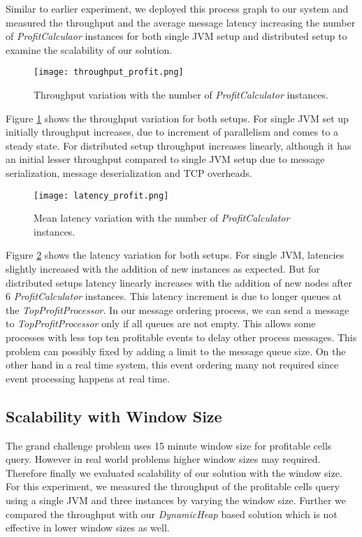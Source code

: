 Similar to earlier experiment,  we deployed this process graph to our system and measured the throughput and the average message latency increasing the number of  \textit{ProfitCalculaor} instances for both single JVM setup and distributed setup to examine the scalability of our solution.

\begin{figure}[!t]
        \centering
        \texttt{[image: throughput\_profit.png]}
        \caption{Throughput variation with the number of \textit{ProfitCalculator} instances.}
        \label{throughput_profit}
\end{figure}
 
Figure \ref{throughput_profit} shows the throughput variation for both setups. For single JVM set up initially throughput increases, due to increment of parallelism and comes to a steady state. For distributed setup  throughput increases linearly, although it has an initial lesser throughput compared to single JVM setup due to message serialization, message deserialization and TCP overheads. 

\begin{figure}[!t]
        \centering
        \texttt{[image: latency\_profit.png]}
        \caption{Mean latency variation with the number of \textit{ProfitCalculator} instances.}
        \label{latency_profit}
\end{figure}

Figure \ref{latency_profit} shows the latency variation for both setups. For single JVM, latencies slightly increased with the addition of new instances as expected. But for distributed setups latency linearly increases with the addition of new nodes after 6 \textit{ProfitCalculator} instances. This latency increment is due to longer queues at the \textit{TopProfitProcessor}. In our message ordering process, we can send a message to \textit{TopProfitProcessor} only if all queues are not empty. This allows some processes with less top ten profitable events to delay other process messages. This problem can  possibly fixed by adding a limit to the message queue size. On the other hand in a real time system, this event ordering many not required since event processing happens at real time.

\subsection{Scalability with Window Size}

The grand challenge problem uses 15 minute window size for profitable cells query. However in real world problems higher window sizes may required. Therefore finally we evaluated scalability of our solution with the window size.  For this experiment, we measured the throughput of the profitable cells query using a single JVM and three instances by varying the window size. Further we compared the throughput with our \textit{DynamicHeap} based solution which is not effective in lower window sizes as well.

